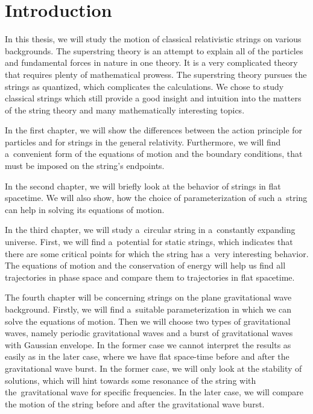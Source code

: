 \chapter*{Introduction}

In this thesis, we will study the motion of classical relativistic strings on various backgrounds. The superstring theory is an attempt to explain all of the particles and fundamental forces in nature in one theory. It is a very complicated theory that requires plenty of mathematical prowess. The superstring theory pursues the strings as quantized, which complicates the calculations. We chose to study classical strings which still provide a good insight and intuition into the matters of the string theory and many mathematically interesting topics.

In the first chapter, we will show the differences between the action principle for particles and for strings in the general relativity. Furthermore, we will find a~convenient form of the equations of motion and the boundary conditions, that must be imposed on the string's endpoints.

In the second chapter, we will briefly look at the behavior of strings in flat spacetime. We will also show, how the choice of parameterization of such a~string can help in solving its equations of motion.

In the third chapter, we will study a~circular string in a~constantly expanding universe. First, we will find a~potential for static strings, which indicates that there are some critical points for which the string has a~very interesting behavior. The equations of motion and the conservation of energy will help us find all trajectories in phase space and compare them to trajectories in flat spacetime.

The fourth chapter will be concerning strings on the plane gravitational wave background. Firstly, we will find a~suitable parameterization in which we can solve the equations of motion. Then we will choose two types of gravitational waves, namely periodic gravitational waves and a burst of gravitational waves with Gaussian envelope. In the former case we cannot interpret the results as easily as in the later case, where we have flat space-time before and after the gravitational wave burst. In the former case, we will only look at the stability of solutions, which will hint towards some resonance of the string with the~gravitational wave for specific frequencies. In the later case, we will compare the motion of the string before and after the gravitational wave burst.


